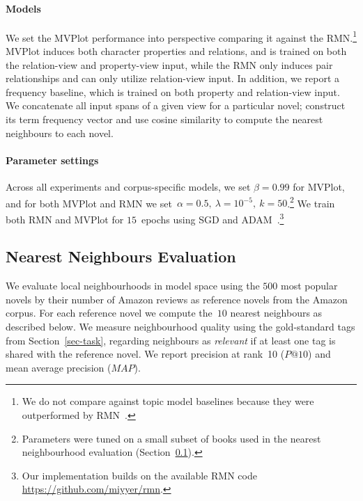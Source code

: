 \documentclass[11pt,letterpaper]{article}
\begin{document}
\paragraph{Models} We set the MVPlot performance into perspective comparing it against the RMN.\footnote{We do not compare against topic model baselines because they were outperformed by RMN~\cite{Iyyer:2016}.} MVPlot induces both character properties and relations, and is trained on both the relation-view and property-view input, while the RMN only induces pair relationships and can only utilize relation-view input. 
In addition, we report a frequency baseline, which is trained on both property and relation-view input. We concatenate all input spans of a given view for a particular novel; construct its term frequency vector and use cosine similarity to compute the nearest neighbours to each novel. 

\paragraph{Parameter settings} Across all experiments and corpus-specific models, we set $\beta{=}0.99$ for MVPlot, and for both MVPlot and RMN we set~$\alpha{=}0.5,\ \lambda{=}10^{-5},\ k{=}50$.\footnote{Parameters were tuned on a small subset of books used in the nearest neighbourhood evaluation (Section~\ref{ssec-knn}).} We train both RMN and MVPlot for $15$~epochs using SGD and ADAM~\cite{Kingma:2014}.\footnote{Our implementation builds on the available RMN code \url{https://github.com/miyyer/rmn}.}


\subsection{Nearest Neighbours Evaluation}
\label{ssec-knn}
We evaluate local neighbourhoods in model space using the $500$ most popular novels by their number of Amazon reviews as reference novels from the Amazon corpus.
For each reference novel we compute the~$10$ nearest neighbours as described below. We measure neighbourhood quality using the gold-standard tags from Section~\ref{sec-task}, regarding neighbours as {\it relevant} if at least one tag is shared with the reference novel. We report precision at rank~10 ($P@10$) and mean average precision ($MAP$).
\end{document}
